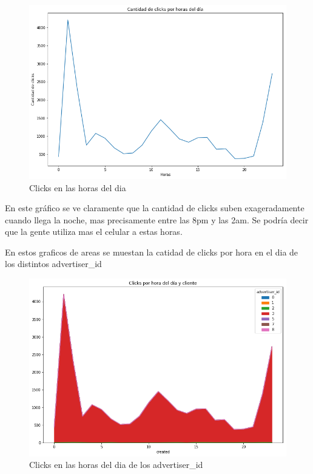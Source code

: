 \documentclass[a4paper, 12pt]{article}
\newcommand\tab[1][1cm]{\hspace*{#1}}
\begin{document}
		\FloatBarrier
		\begin{figure}[h]
			\centering
			\includegraphics[width=\textwidth]{images/clicks/clicks_hours.png}
			\caption{Clicks en las horas del dia}
		\end{figure}
		\FloatBarrier
		
		\tab En este gráfico se ve claramente que la cantidad de clicks suben exageradamente cuando llega la noche, mas precisamente entre las 8pm y las 2am. Se podría decir que la gente utiliza mas el celular a estas horas.

		\tab En estos graficos de areas se muestan la catidad de clicks por hora en el dia de los distintos advertiser\_id

		\FloatBarrier
		\begin{figure}[h]
			\centering
			\includegraphics[width=\textwidth]{images/clicks/clicks_advertiser_id_hours.png}
			\caption{Clicks en las horas del dia de los advertiser\_id}
		\end{figure}
		\FloatBarrier
	
\end{document}
